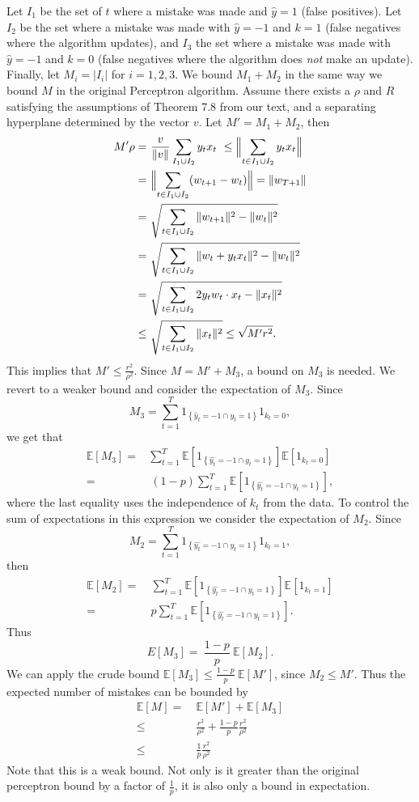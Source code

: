 \documentclass[12pt]{article}
\newcommand{\E}[0]{\mathbb{E}}
\begin{document}
Let $I_1$ be the set of $t$ where a mistake was made and
$\widehat{y}=1$ (false positives).  Let $I_2$ be the set where a mistake was made with
$\widehat{y} = -1$ and $k = 1$ (false negatives where the algorithm updates), and $I_3$ the set where a mistake was
made with $\widehat{y} = -1$ and $k = 0$ (false negatives where the algorithm does {\it not} make an update). Finally, let $M_i = |I_i|$ for $i =
1,2,3$. We bound $M_1 + M_2$ in the same way we bound $M$ in the original Perceptron algorithm. Assume there exists a $\rho$ and $R$ satisfying the assumptions of Theorem 7.8 from our text, and a separating hyperplane determined by the vector $v$. Let $M' = M_1 + M_2$, then
\begin{align*}
M' \rho =&\ \frac{v}{\|v\|}\sum_{I_1 \cup I_2} y_tx_t \
 \leq   \Bigl\|\sum_{t \in I_1 \cup I_2} y_t x_t\Bigr\| \\
=& \ \Bigl\|\sum_{t \in I_1 \cup I_2} (w_{t+1} - w_t) \Bigr\| 
=  \|w_{T+1} \| \\
=&\ \sqrt{\sum_{t \in I_1 \cup I_2} \|  w_{t+1}\|^2 - \|w_t\|^2 }\\
= &\ \sqrt{\sum_{t \in I_1 \cup I_2} \|  w_{t} + y_t x_t\|^2 - \|w_t\|^2 }\\
= &\ \sqrt{\sum_{t \in I_1 \cup I_2} 2y_t w_t\cdot x_t - \|x_t\|^2} \\
\leq &\ \sqrt{\sum_{t \in I_1 \cup I_2} \|x_t\|^2}
\leq \sqrt{M'r^2}.
\end{align*}
This implies that $M' \leq \frac{r^2}{\rho^2}$. Since $M = M' + M_3$, a bound on $M_3$ is needed. We revert to a weaker bound and consider the expectation of
$M_3$. Since 
\[M_3 = \sum_{t=1}^T 1_{\left\{\widehat{y}_t = -1 \cap y_t = 1\right\}}1_{k_t = 0}, \]
we get that
\begin{align*}
\E[M_3] = & \sum_{t=1}^T \E[1_{\left\{\widehat{y_t} = -1 \cap y_t = 1\right\}}]\E[1_{k_t = 0}] \\
 = &\ (1 - p)\sum_{t=1}^T \E[1_{\left\{\widehat{y_t} = -1 \cap y_t = 1\right\}}],
\end{align*}
where the last equality uses the independence of $k_t$ from the data. To control the sum of expectations in this expression we consider the expectation of $M_2$. Since
\[
M_2 =  \sum_{t=1}^T 1_{\left\{\hat{y_t} = -1 \cap y_t = 1\right\}}1_{k_t = 1},
\]
then
\begin{align*}
\E[M_2] =&\ \sum_{t=1}^T \E[1_{\left\{\hat{y_t} = -1 \cap y_t = 1\right\}}]\E[1_{k_t = 1}] \\
=&\ p\sum_{t=1}^T \E[1_{\left\{\hat{y_t} = -1 \cap y_t = 1\right\}}].
\end{align*}
Thus
\[
E[M_3] = \ \frac{1-p}{p}\ \E[M_2].
\]
We can apply the crude bound $\E[M_3] \leq \frac{1-p}{p}\ \E[M']$, since $M_2 \leq M'$. Thus the expected number of mistakes can be bounded by
\begin{align*}
\E[M]  =  &\ \E[M'] + \E[M_3] \\
\leq & \ \frac{r^2}{\rho^2} + \frac{1-p}{p}\frac{r^2}{\rho^2} \\
\leq  & \ \frac{1}{p}\frac{r^2}{\rho^2}
\end{align*}
Note that this is a weak bound.  Not only is it greater than the
original perceptron bound by a factor of $\frac{1}{p}$, it is also only a
bound in expectation.
\end{document}
